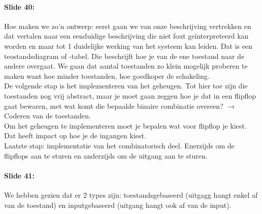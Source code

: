 \documentclass[10pt,a4paper]{book}
\begin{document}
\paragraph{Slide 40:} Hoe maken we zo'n ontwerp: eerst gaan we van onze beschrijving vertrekken en dat vertalen naar een eenduidige beschrijving die niet fout ge\"interpreteerd kan worden en maar tot 1 duidelijke werking van het systeem kan leiden. Dat is een teostandsdiagram of -tabel. Die beschrijft hoe je van de ene toestand naar de andere overgaat. We gaan dat aantal toestanden zo klein mogelijk proberen te maken want hoe minder toestanden, hoe goedkoper de schakeling.\\
De volgende stap is het implementeren van het geheugen. Tot hier toe zijn die toestanden nog vrij abstract, maar je moet gaan zeggen hoe je dat in een flipflop gaat bewaren, met wat komt die bepaalde binaire combinatie overeen? $\rightarrow$ Coderen van de toestanden.\\
Om het geheugen te implementeren moet je bepalen wat voor flipflop je kiest. Dat heeft impact op hoe je de ingangen kiest.\\
Laatste stap: implementatie van het combinatorisch deel. Enerzijds om de flipflops aan te sturen en anderzijds om de uitgang aan te sturen.

\paragraph{Slide 41:} We hebben gezien dat er 2 types zijn: toestandsgebaseerd (uitgagg hangt enkel af van de toestand) en inputgebaseerd (uitgang hangt ook af van de input).
\end{document}
